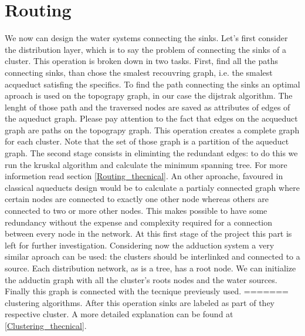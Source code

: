 \section{Routing}
We now can design the water systems connecting the sinks. Let’s first consider the distribution layer, 
which is to say the problem of connecting the sinks of a cluster. This operation is broken down in two 
tasks. First, find all the paths connecting sinks, than chose the smalest recouvring graph, i.e. the 
smalest acqueduct satisfing the specifics. \hfill 
To find the path connecting the sinks an optimal aproach is used on the topograpy graph, in our case 
the dijstrak algorithm. The lenght of those path and the traversed nodes are saved as attributes of 
edges of the aqueduct graph. Please pay attention to the fact that edges on the acqueduct graph are 
paths on the topograpy graph. This operation creates a complete graph for each cluster. Note that the 
set of those graph is a partition of the aqueduct graph. \hfill 
The second stage consists in eliminting the redundant edges: to do this we run the kruskal algorithm 
and calculate the minimum spanning tree. For more informetion read section \ref{Routing_thecnical}. 
An other aproache, favoured in classical aqueducts design would be to calculate a partialy connected 
graph where certain nodes are connected to exactly one other node whereas others are connected to two 
or more other nodes. This makes possible to have some redundancy without the expense and complexity 
required for a connection between every node in the network. At this first stage of the project this 
part is left for further investigation.
Considering now the adduction system a very similar aproach can be used: the clusters should be 
interlinked and connected to a source. Each distribution network, as is a tree, has a root node. 
We can initialize the adductin graph with all the cluster's roots nodes and the water sources. 
Finally this graph is connected with the tecnique previeusly used.
=======
clustering algorithms. After this operation sinks are labeled as part of they respective cluster. A more detailed explanation can be found at \ref {Clustering_thecnical}.

